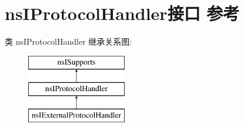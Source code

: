 \hypertarget{interfacens_i_protocol_handler}{}\section{ns\+I\+Protocol\+Handler接口 参考}
\label{interfacens_i_protocol_handler}
类 ns\+I\+Protocol\+Handler 继承关系图\+:\begin{figure}[H]
\begin{center}
\leavevmode
\includegraphics[height=3.000000cm]{interfacens_i_protocol_handler}
\end{center}
\end{figure}
